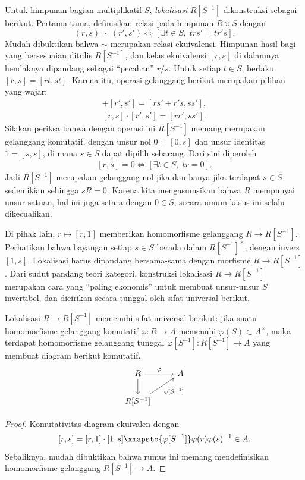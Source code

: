 Untuk himpunan bagian multiplikatif $S$, \emph{lokalisasi} $R[S^{-1}]$ dikonstruksi sebagai berikut. Pertama-tama, definisikan relasi pada himpunan $R \times S$ dengan 
\[ (r,s) \sim (r',s') \iff \left[ \exists t \in S, \; trs' = tr's \right]. \]
Mudah dibuktikan bahwa $\sim$ merupakan relasi ekuivalensi. Himpunan hasil bagi yang bersesuaian ditulis $R[S^{-1}]$, dan kelas ekuivalensi $[r,s]$ di dalamnya hendaknya dipandang sebagai ``pecahan'' $r/s$. Untuk setiap $t \in S$, berlaku $[r,s]=[rt,st]$. Karena itu, operasi gelanggang berikut merupakan pilihan yang wajar:
\begin{gather*}
	[r,s] + [r',s'] = [rs' + r's, ss'], \\
	[r,s] \cdot [r',s'] = [rr', ss'].
\end{gather*}
Silakan periksa bahwa dengan operasi ini $R[S^{-1}]$ memang merupakan gelanggang komutatif, dengan unsur nol $0 = [0, s]$ dan unsur identitas $1 = [s,s]$, di mana $s \in S$ dapat dipilih sebarang. Dari sini diperoleh
\begin{gather}\label{eqn:localization-zero}
	[r,s]=0 \iff \left[ \exists t \in S, \; tr=0 \right].
\end{gather}
Jadi $R[S^{-1}]$ merupakan gelanggang nol jika dan hanya jika terdapat $s \in S$ sedemikian sehingga $sR=0$. Karena kita mengasumsikan bahwa $R$ mempunyai unsur satuan, hal ini juga setara dengan $0 \in S$; secara umum kasus ini selalu dikecualikan.

Di pihak lain, $r \mapsto [r,1]$ memberikan homomorfisme gelanggang $R \to R[S^{-1}]$. Perhatikan bahwa bayangan setiap $s \in S$ berada dalam $R[S^{-1}]^\times$, dengan invers $[1,s]$. Lokalisasi harus dipandang bersama-sama dengan morfisme $R \to R[S^{-1}]$. Dari sudut pandang teori kategori, konstruksi lokalisasi $R \to R[S^{-1}]$ merupakan cara yang ``paling ekonomis'' untuk membuat unsur-unsur $S$ invertibel, dan dicirikan secara tunggal oleh sifat universal berikut.

\begin{proposition}
	Lokalisasi $R \to R[S^{-1}]$ memenuhi sifat universal berikut: jika suatu homomorfisme gelanggang komutatif $\varphi: R \to A$ memenuhi $\varphi(S) \subset A^\times$, maka terdapat homomorfisme gelanggang tunggal $\varphi[S^{-1}]: R[S^{-1}] \to A$ yang membuat diagram berikut komutatif.
	\[ \begin{tikzcd}
		R \arrow[r, "\varphi"] \arrow[d] & A \\
		R[S^{-1}] \arrow[ru, "{\varphi[S^{-1}]}"'] &
	\end{tikzcd} \]
\end{proposition}
\begin{proof}
	Komutativitas diagram ekuivalen dengan
	\[ [r,s] =[r,1] \cdot [1,s] \xmapsto{\varphi[S^{-1}]} \varphi(r) \varphi(s)^{-1} \in A. \]
	Sebaliknya, mudah dibuktikan bahwa rumus ini memang mendefinisikan homomorfisme gelanggang $R[S^{-1}] \to A$.
\end{proof}

